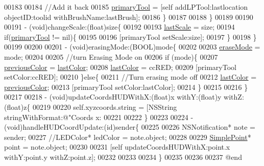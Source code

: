 \begin{DoxyCode}
00183         
00184         \textcolor{comment}{//Add it back}
00185         \hyperlink{interface_h_u_d_layer_aad9b0e2b4164986e18ea0a9afcd1a914}{primaryTool} = [\textcolor{keyword}{self} addLPTool:lastlocation objectID:toolid withBrushName:lastBrush];
00186     \}
00187     
00188 \}
00189 
00190 
00191 - (void)changeScale:(\textcolor{keywordtype}{float})size\{
00192     
00193     \hyperlink{interface_h_u_d_layer_aedd1d8d2b2d31e203c3242d09390b561}{lastScale} = size;
00194     \textcolor{keywordflow}{if}(\hyperlink{interface_h_u_d_layer_aad9b0e2b4164986e18ea0a9afcd1a914}{primaryTool} != nil)\{
00195         
00196         [primaryTool setScale:size];
00197     \}
00198 \}
00199 
00200 
00201 - (void)erasingMode:(BOOL)mode\{
00202     
00203     \hyperlink{interface_h_u_d_layer_aa1df984387a5f884acf38a7d733d6432}{eraseMode} = mode;
00204 
00205     \textcolor{comment}{//turn Erasing Mode on}
00206     \textcolor{keywordflow}{if} (mode)\{
00207         \hyperlink{interface_h_u_d_layer_a2b737d7aa3b728dd3d5990ef4cb68f29}{previousColor} = \hyperlink{interface_h_u_d_layer_a2d27bf64876ea6f0b2f0d1b9013c1cd7}{lastColor};
00208         \hyperlink{interface_h_u_d_layer_a2d27bf64876ea6f0b2f0d1b9013c1cd7}{lastColor} = ccRED;
00209         [primaryTool setColor:ccRED];
00210     \}\textcolor{keywordflow}{else}\{
00211         \textcolor{comment}{//Turn erasing mode off}
00212         \hyperlink{interface_h_u_d_layer_a2d27bf64876ea6f0b2f0d1b9013c1cd7}{lastColor} = \hyperlink{interface_h_u_d_layer_a2b737d7aa3b728dd3d5990ef4cb68f29}{previousColor};
00213         [primaryTool setColor:lastColor];
00214     \}
00215 
00216 \}
00217 
00218 - (void)updateCoordsHUDWithX:(\textcolor{keywordtype}{float})x withY:(\textcolor{keywordtype}{float})y withZ:(\textcolor{keywordtype}{float})z\{
00219     
00220     \textcolor{keyword}{self}.xyzcoords.string = [NSString stringWithFormat:@"Coords x: %
00221     
00222 \}
00223 
00224 - (void)handleHUDCoordUpdate:(\textcolor{keywordtype}{id})sender\{
00225     
00226     NSNotification* note = sender;
00227     \textcolor{comment}{//LEDColor* ledColor = note.object;}
00228     
00229     \hyperlink{interface_simple_point}{SimplePoint}* point = note.object;
00230     
00231     [\textcolor{keyword}{self} updateCoordsHUDWithX:point.x withY:point.y withZ:point.z];
00232     
00233     
00234 \}
00235 
00236 
00237 \textcolor{keyword}{@end}
\end{DoxyCode}
